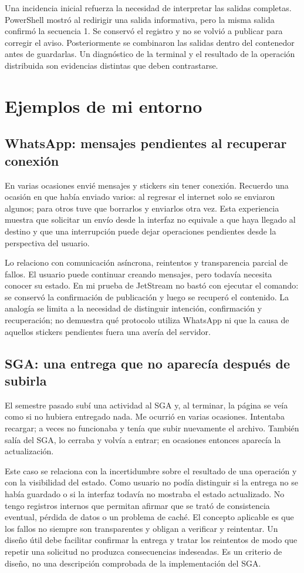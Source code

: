\documentclass[11pt,a4paper]{article}
\newcommand{\archivo}[1]{\texttt{\detokenize{#1}}}
\begin{document}
Una incidencia inicial refuerza la necesidad de interpretar las salidas completas. PowerShell mostró \archivo{NativeCommandError} al redirigir una salida informativa, pero la misma salida confirmó la secuencia 1. Se conservó el registro y no se volvió a publicar para corregir el aviso. Posteriormente se combinaron las salidas dentro del contenedor antes de guardarlas. Un diagnóstico de la terminal y el resultado de la operación distribuida son evidencias distintas que deben contrastarse.

\section{Ejemplos de mi entorno}
\subsection{WhatsApp: mensajes pendientes al recuperar conexión}
En varias ocasiones envié mensajes y stickers sin tener conexión. Recuerdo una ocasión en que había enviado varios: al regresar el internet solo se enviaron algunos; para otros tuve que borrarlos y enviarlos otra vez. Esta experiencia muestra que solicitar un envío desde la interfaz no equivale a que haya llegado al destino y que una interrupción puede dejar operaciones pendientes desde la perspectiva del usuario.

Lo relaciono con comunicación asíncrona, reintentos y transparencia parcial de fallos. El usuario puede continuar creando mensajes, pero todavía necesita conocer su estado. En mi prueba de JetStream no bastó con ejecutar el comando: se conservó la confirmación de publicación y luego se recuperó el contenido. La analogía se limita a la necesidad de distinguir intención, confirmación y recuperación; no demuestra qué protocolo utiliza WhatsApp ni que la causa de aquellos stickers pendientes fuera una avería del servidor.

\subsection{SGA: una entrega que no aparecía después de subirla}
El semestre pasado subí una actividad al SGA y, al terminar, la página se veía como si no hubiera entregado nada. Me ocurrió en varias ocasiones. Intentaba recargar; a veces no funcionaba y tenía que subir nuevamente el archivo. También salía del SGA, lo cerraba y volvía a entrar; en ocasiones entonces aparecía la actualización.

Este caso se relaciona con la incertidumbre sobre el resultado de una operación y con la visibilidad del estado. Como usuario no podía distinguir si la entrega no se había guardado o si la interfaz todavía no mostraba el estado actualizado. No tengo registros internos que permitan afirmar que se trató de consistencia eventual, pérdida de datos o un problema de caché. El concepto aplicable es que los fallos no siempre son transparentes y obligan a verificar y reintentar. Un diseño útil debe facilitar confirmar la entrega y tratar los reintentos de modo que repetir una solicitud no produzca consecuencias indeseadas. Es un criterio de diseño, no una descripción comprobada de la implementación del SGA.
\end{document}
